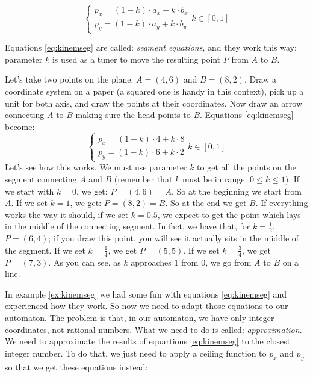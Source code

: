\begin{equation}
\label{eq:kinemseg}
\begin{cases}
p_x = (1-k) \cdot a_x + k \cdot b_x\\
p_y = (1-k) \cdot a_y + k \cdot b_y
\end{cases}
k \in [0,1]
\end{equation}

Equations \ref{eq:kinemseg} are called: \textit{segment equations}, and they work 
this way: parameter $k$ is used as a tuner to move the resulting
point $P$ from $A$ to $B$.

\begin{example}
\label{ex:kinemseg}
Let's take two points on the plane: $A = (4,6)$ and $B = (8,2)$. Draw a coordinate system
on a paper (a squared one is handy in this context),
pick up a unit for both axis, and draw the points at their coordinates. Now draw an arrow
connecting $A$ to $B$ making sure the head points to $B$. Equations \ref{eq:kinemseg}
become:
\begin{equation*}
\begin{cases}
p_x = (1-k) \cdot 4 + k \cdot 8\\
p_y = (1-k) \cdot 6 + k \cdot 2
\end{cases}
k \in [0,1]
\end{equation*}
Let's see how this works. We must use parameter $k$ to get all the points on the segment
connecting $A$ and $B$ (remember that $k$ must be in range: $0 \leq k \leq 1$). If we
start with $k=0$, we get: $P = (4,6) = A$. So at the beginning we start from $A$. If we
set $k=1$, we get: $P = (8,2) = B$. So at the end we get $B$. If everything works the way
it should, if we set $k=0.5$, we expect to get the point which lays in the middle of the
connecting segment. In fact, we have that, for $k=\frac{1}{2}$, $P = (6,4)$; if you draw
this point, you will see it actually sits in the middle of the segment.
If we set $k=\frac{1}{4}$, we get $P = (5,5)$.
If we set $k=\frac{3}{4}$, we get $P = (7,3)$.
As you can see, as $k$ approaches $1$ from $0$, we go from $A$ to $B$ on a line.
\end{example}

In example \ref{ex:kinemseg} we had some fun with equations \ref{eq:kinemseg}
and experienced how they work. So now we need to adapt those equations to our automaton.
The problem is that, in our automaton, we have only integer coordinates, not rational
numbers. What we need to do is called: \textit{approximation}. We need to approximate
the results of equartions \ref{eq:kinemseg} to the closest integer number.
To do that, we just need to apply a ceiling function to $p_x$ and $p_y$ so that we get
these equations instead:

